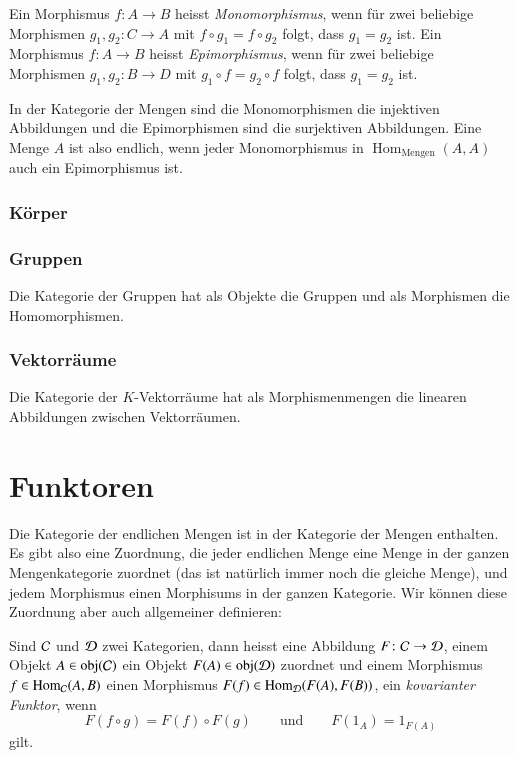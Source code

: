 \begin{definition}
Ein Morphismus $f\colon A\to B$ heisst {\em Monomorphismus}, wenn 
für zwei beliebige Morphismen $g_1,g_2\colon C\to A$ mit
$f\circ g_1=f\circ g_2$ folgt, dass $g_1=g_2$ ist.
Ein Morphismus $f\colon A\to B$ heisst {\em Epimorphismus}, wenn
für zwei beliebige Morphismen $g_1,g_2\colon B\to D$ mit
$g_1\circ f=g_2\circ f$ folgt, dass $g_1=g_2$ ist.
\end{definition}
%
%
In der Kategorie der Mengen sind die Monomorphismen die injektiven
Abbildungen und die Epimorphismen sind die surjektiven Abbildungen.
Eine Menge $A$ ist also endlich, wenn jeder Monomorphismus in
$\operatorname{Hom}_{\text{Mengen}}(A,A)$ auch ein Epimorphismus ist.

\subsubsection{Körper}

\subsubsection{Gruppen}
Die Kategorie der Gruppen hat als Objekte die Gruppen und als
Morphismen die Homomorphismen.

\subsubsection{Vektorräume}
Die Kategorie der $K$-Vektorräume hat als Morphismenmengen die linearen
Abbildungen zwischen Vektorräumen.

\section{Funktoren}
Die Kategorie der endlichen Mengen ist in der Kategorie der Mengen enthalten.
Es gibt also eine Zuordnung, die jeder endlichen Menge eine Menge in
der ganzen Mengenkategorie zuordnet (das ist natürlich immer noch die
gleiche Menge), und jedem Morphismus einen Morphisums in der ganzen
Kategorie.
Wir können diese Zuordnung aber auch allgemeiner definieren:

\begin{definition}
Sind $\cal C$ und $\cal D$ zwei Kategorien, dann heisst eine Abbildung
$F\colon\cal C\to \cal D$, einem Objekt $A\in \operatorname{obj}(\cal C)$
ein Objekt $F(A)\in\operatorname{obj}(\cal D)$ zuordnet und einem
Morphismus $f\in\operatorname{Hom}_{\cal C}(A,B)$ einen Morphismus
$F(f)\in\operatorname{Hom}_{\cal D}(F(A),F(B))$, ein {\em kovarianter Funktor},
wenn
\[
F(f\circ g)=F(f)\circ F(g)
\qquad\text{und}\qquad
F(1_A)=1_{F(A)}
\]
gilt.
\end{definition}

